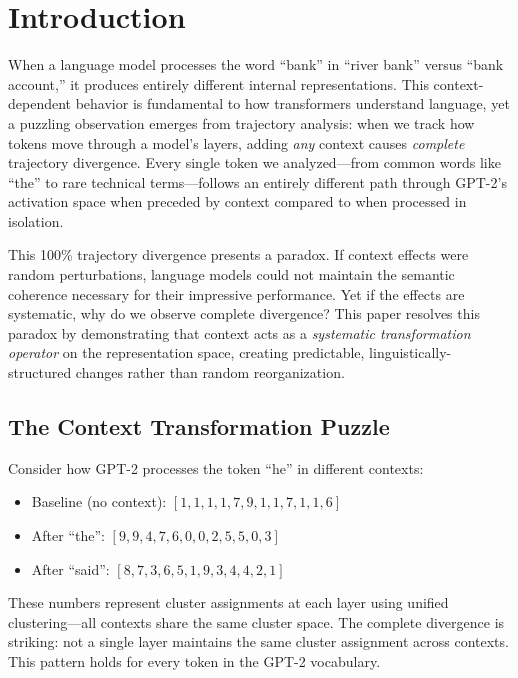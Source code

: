 
\section{Introduction}

When a language model processes the word ``bank'' in ``river bank'' versus ``bank account,'' it produces entirely different internal representations. This context-dependent behavior is fundamental to how transformers understand language, yet a puzzling observation emerges from trajectory analysis: when we track how tokens move through a model's layers, adding \emph{any} context causes \emph{complete} trajectory divergence. Every single token we analyzed---from common words like ``the'' to rare technical terms---follows an entirely different path through GPT-2's activation space when preceded by context compared to when processed in isolation.

This 100\% trajectory divergence presents a paradox. If context effects were random perturbations, language models could not maintain the semantic coherence necessary for their impressive performance. Yet if the effects are systematic, why do we observe complete divergence? This paper resolves this paradox by demonstrating that context acts as a \emph{systematic transformation operator} on the representation space, creating predictable, linguistically-structured changes rather than random reorganization.

\subsection{The Context Transformation Puzzle}

Consider how GPT-2 processes the token ``he'' in different contexts:
\begin{itemize}
    \item Baseline (no context): $[1, 1, 1, 1, 7, 9, 1, 1, 7, 1, 1, 6]$
    \item After ``the'': $[9, 9, 4, 7, 6, 0, 0, 2, 5, 5, 0, 3]$
    \item After ``said'': $[8, 7, 3, 6, 5, 1, 9, 3, 4, 4, 2, 1]$
\end{itemize}

These numbers represent cluster assignments at each layer using unified clustering---all contexts share the same cluster space. The complete divergence is striking: not a single layer maintains the same cluster assignment across contexts. This pattern holds for every token in the GPT-2 vocabulary.

